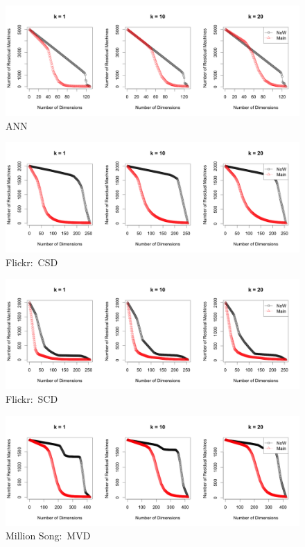 \begin{figure}[htpb!]
  \centering
  \includegraphics[width=1.0\linewidth]{exp/prune/ANN.png}
  \caption{ANN}
  \label{fig:prune_ANN}
\end{figure}

\begin{figure}[htpb!]
  \centering
  \includegraphics[width=1.0\linewidth]{exp/prune/f2.png}
  \caption{Flickr:~CSD}
  \label{fig:prune_f2}
\end{figure}

\begin{figure}[htpb!]
  \centering
  \includegraphics[width=1.0\linewidth]{exp/prune/f3.png}
  \caption{Flickr:~SCD}
  \label{fig:prune_f3}
\end{figure}

\begin{figure}[htpb!]
  \centering
  \includegraphics[width=1.0\linewidth]{exp/prune/mvd.png}
  \caption{Million Song:~MVD}
  \label{fig:prune_mvd}
\end{figure}

